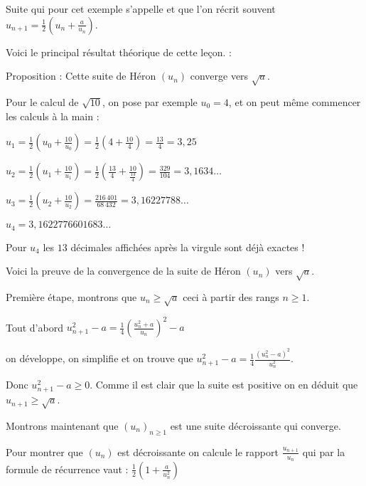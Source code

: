 Suite qui pour cet exemple s'appelle  et que l'on récrit souvent
$u_{n+1} = \frac12 \left(u_n+\frac{a}{u_n}\right).$


\change

Voici le principal résultat théorique de cette leçon. :

Proposition : 
Cette suite de Héron $(u_n)$ converge vers $\sqrt{a}$. 

\change


Pour le calcul de $\sqrt{10}$, on pose par exemple $u_0=4$, et on peut même commencer les calculs à la main :

\change

$u_1 = \frac12 \left(u_0+\frac{10}{u_0}\right) = \frac12\left(4+\frac{10}{4}\right) = \frac{13}{4} = 3,25 $

\change

$u_2 = \frac12 \left(u_1+\frac{10}{u_1}\right) = \frac12\left(\tfrac{13}{4}+\frac{10}{\tfrac{13}{4}}\right) 
  = \frac{329}{104} = 3,1634\ldots$
 
\change 

$u_3 = \frac12 \left(u_2+\frac{10}{u_2}\right) = \frac{216\,401}{68\,432} = 3,16227788 \ldots$

\change

$u_4 = 3,1622776601683\ldots  $


Pour $u_4$ les $13$ décimales affichées après la virgule  sont déjà exactes !


\diapo


Voici la preuve de la convergence de la suite de Héron $(u_n)$ vers $\sqrt{a}$.

\change

Première étape, montrons que $u_n \ge \sqrt{a}$ ceci à partir des rangs $n\ge1$.
  
  Tout d'abord 
  $u_{n+1}^2-a = \frac14 \left(\frac{u_n^2 + a}{u_n}\right)^2 - a $
  
  on développe, on simplifie et on trouve que 
  $u_{n+1}^2-a=\frac14 \frac{(u_n^2-a)^2}{u_n^2}$.
  
  Donc $u_{n+1}^2 - a \ge 0$. Comme il est clair que la suite est positive 
  on en déduit que $u_{n+1} \ge \sqrt{a}$. 
  

\change  

Montrons maintenant que $(u_n)_{n\ge1}$ est une suite décroissante qui converge.

  Pour  montrer que $(u_n)$ est décroissante on calcule le rapport 
$\frac{u_{n+1}}{u_n}$ qui par la formule de récurrence vaut :
$\frac12 \left(1+\frac{a}{u_n^2}\right)$

